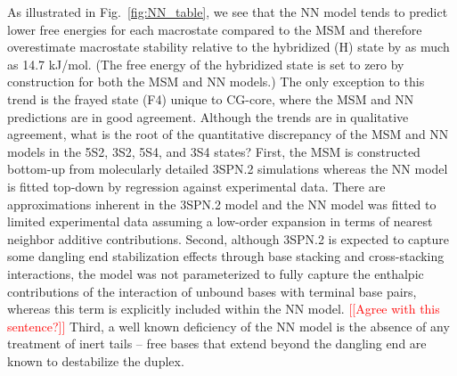 \documentclass[journal=jpcbfk,manuscript=article]{achemso}
\newcommand*{\noter}[1]{\textcolor{red}{[[#1]]}}		%
\newcommand*{\noteb}[1]{\textcolor{blue}{[[#1]]}}		%
\begin{document}
As illustrated in Fig.~\ref{fig:NN_table}, we see that the NN model tends to predict lower free energies for each macrostate compared to the MSM and therefore overestimate macrostate stability relative to the hybridized (H) state by as much as 14.7 kJ/mol. (The free energy of the hybridized state is set to zero by construction for both the MSM and NN models.) The only exception to this trend is the frayed state (F4) unique to CG-core, where the MSM and NN predictions are in good agreement. Although the trends are in qualitative agreement, what is the root of the quantitative discrepancy of the MSM and NN models in the 5S2, 3S2, 5S4, and 3S4 states? First, the MSM is constructed bottom-up from molecularly detailed 3SPN.2 simulations whereas the NN model is fitted top-down by regression against experimental data. There are approximations inherent in the 3SPN.2 model and the NN model was fitted to limited experimental data assuming a low-order expansion in terms of nearest neighbor additive contributions. Second, although 3SPN.2 is expected to capture some dangling end stabilization effects through base stacking and cross-stacking interactions, the model was not parameterized to fully capture the enthalpic contributions of the interaction of unbound bases with terminal base pairs, whereas this term is explicitly included within the NN model. \noter{Agree with this sentence?} Third, a well known deficiency of the NN model is the absence of any treatment of inert tails -- free bases that extend beyond the dangling end are known to destabilize the duplex.\citep{Michele2014EHybridization}

\end{document}
